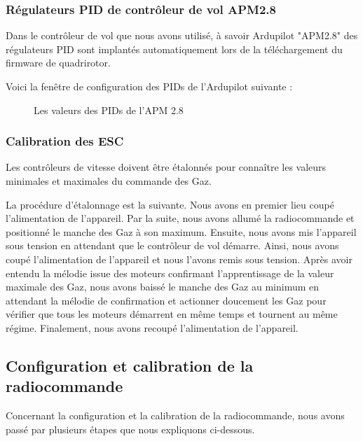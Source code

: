 	\subsubsection{Régulateurs PID de contrôleur de vol APM2.8}
	Dans le contrôleur de vol que nous avons utilisé, à savoir Ardupilot "APM2.8" des régulateurs PID sont implantés automatiquement lors de la téléchargement du firmware de quadrirotor.
	
	Voici la fenêtre de configuration des PIDs de l'Ardupilot suivante :
		\begin{figure} [H]
		\begin{center}
			\centering
		\end{center}
		\caption{Les valeurs des PIDs de l'APM 2.8}
	\end{figure}

	\subsubsection{Calibration des ESC}
	Les contrôleurs de vitesse doivent être étalonnés pour connaître les valeurs minimales et maximales du commande des Gaz. 
		
	La procédure d’étalonnage est la suivante. Nous avons en premier lieu coupé l'alimentation de l'appareil. Par la suite, nous avons allumé la radiocommande et positionné le manche des Gaz à son maximum. Ensuite, nous avons mis l'appareil sous tension en attendant que le contrôleur de vol démarre. Ainsi, nous avons coupé l'alimentation de l'appareil et nous l'avons remis sous tension. Après avoir entendu la mélodie issue des moteurs confirmant l'apprentissage de la valeur maximale des Gaz, nous avons baissé le manche des Gaz au minimum en attendant la mélodie de confirmation et actionner doucement les Gaz pour vérifier que tous les moteurs démarrent en même temps et tournent au même régime. Finalement, nous avons recoupé l'alimentation de l'appareil.
	\subsection{Configuration et calibration de la radiocommande}
	Concernant la configuration et la calibration de la radiocommande, nous avons passé par plusieurs étapes que nous expliquons ci-dessous. 
